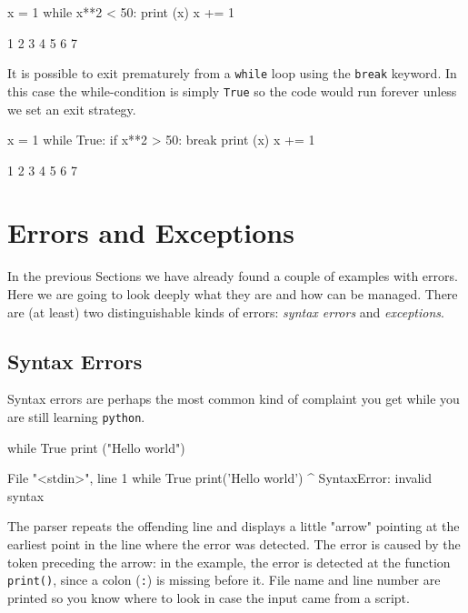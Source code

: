 \begin{ipython}
x = 1
while x**2 < 50:
    print (x)
    x += 1	
\end{ipython}
\begin{ioutput}
1
2
3
4
5
6
7	
\end{ioutput}

It is possible to exit prematurely from a \texttt{while} loop using the \texttt{break} keyword. 
In this case the while-condition is simply \texttt{True} so the code would run forever 
unless we set an exit strategy.

\begin{ipython}
x = 1
while True:
    if x**2 > 50:
        break
    print (x)
    x += 1	
\end{ipython}
\begin{ioutput}
1
2
3
4
5
6
7	
\end{ioutput}

\section{Errors and Exceptions}
In the previous Sections we have already found a couple of examples with errors.
Here we are going to look deeply what they are and how can be managed.
There are (at least) two distinguishable kinds of errors:  \emph{syntax errors} and \emph{exceptions}.

\subsection{Syntax Errors}
Syntax errors are perhaps the most common kind of complaint you get while you are still learning \texttt{python}.

\begin{ipython}
while True
    print ("Hello world")
\end{ipython}
\begin{ioutput}
  File "<stdin>", line 1
    while True print('Hello world')
               ^
SyntaxError: invalid syntax
\end{ioutput}

The parser repeats the offending line and displays a little "arrow" 
pointing at the earliest point in the line where the error was detected. 
The error is caused by the token preceding the arrow: in the example, 
the error is detected at the function \texttt{print()}, 
since a colon (\texttt{:}) is missing before it. 
File name and line number are printed so you know where to look in case the input came from a script.

